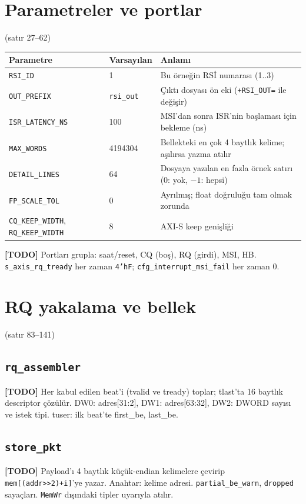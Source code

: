 \documentclass[11pt,a4paper]{article}
\newcommand{\kod}[1]{\texttt{#1}}
\newcommand{\todo}[1]{\textcolor{red!60!black}{\textbf{[TODO]} #1}}
\newcommand{\satir}[1]{\textcolor{black!60}{\scriptsize(satır #1)}}
\begin{document}
\section{Parametreler ve portlar}
\satir{27--62}

\begin{longtable}{@{}p{3.6cm}p{2.2cm}p{9.1cm}@{}}
\toprule
Parametre & Varsayılan & Anlamı \\
\midrule
\endhead
\kod{RSI\_ID} & 1 & Bu örneğin RSİ numarası (1..3) \\
\kod{OUT\_PREFIX} & \kod{rsi\_out} & Çıktı dosyası ön eki (\kod{+RSI\_OUT=} ile değişir) \\
\kod{ISR\_LATENCY\_NS} & 100 & MSI'dan sonra ISR'nin başlaması için bekleme (ns) \\
\kod{MAX\_WORDS} & 4194304 & Bellekteki en çok 4 baytlık kelime; aşılırsa yazma atılır \\
\kod{DETAIL\_LINES} & 64 & Dosyaya yazılan en fazla örnek satırı (0: yok, $-1$: hepsi) \\
\kod{FP\_SCALE\_TOL} & 0 & Ayrılmış; float doğruluğu tam olmak zorunda \\
\kod{CQ\_KEEP\_WIDTH}, \kod{RQ\_KEEP\_WIDTH} & 8 & AXI-S keep genişliği \\
\bottomrule
\end{longtable}

\todo{Portları grupla: saat/reset, CQ (boş), RQ (girdi), MSI, HB. \kod{s\_axis\_rq\_tready}
her zaman \kod{4'hF}; \kod{cfg\_interrupt\_msi\_fail} her zaman 0.}

\section{RQ yakalama ve bellek}
\satir{83--141}

\subsection{\kod{rq\_assembler}}
\todo{Her kabul edilen beat'i (tvalid ve tready) toplar; tlast'ta 16 baytlık
descriptor çözülür. DW0: adres[31:2], DW1: adres[63:32], DW2: DWORD sayısı ve istek
tipi. tuser: ilk beat'te first\_be, last\_be.}

\subsection{\kod{store\_pkt}}
\todo{Payload'ı 4 baytlık küçük-endian kelimelere çevirip \kod{mem[(addr>>2)+i]}'ye
yazar. Anahtar: kelime adresi. \kod{partial\_be\_warn}, \kod{dropped} sayaçları.
\kod{MemWr} dışındaki tipler uyarıyla atılır.}
\end{document}
